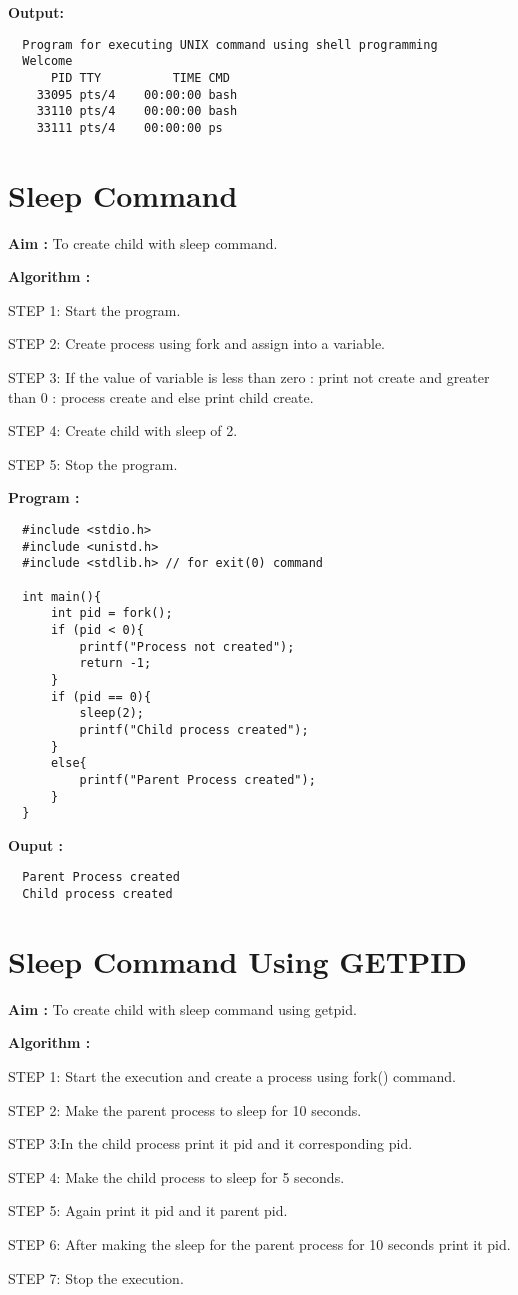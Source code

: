 \documentclass[journal,onecolumn]{IEEEtran}
\begin{document}
\textbf{Output:}
\begin{verbatim}
  Program for executing UNIX command using shell programming 
  Welcome
      PID TTY          TIME CMD
    33095 pts/4    00:00:00 bash
    33110 pts/4    00:00:00 bash
    33111 pts/4    00:00:00 ps  
\end{verbatim}


\section{Sleep Command}
\textbf{Aim : } To create child with sleep command.

\textbf{Algorithm : }
\begin{list}{}{}
  \item STEP 1: Start the program.
  \item STEP 2: Create process using fork and assign into a variable.
  \item STEP 3: If the value of variable is less than zero : print not create and greater than 0 :  process create
  and else print child create.
  \item STEP 4: Create child with sleep of
  2. 
  \item STEP 5: Stop the program.
\end{list}

\textbf{Program : }
\begin{verbatim}
  #include <stdio.h>
  #include <unistd.h>
  #include <stdlib.h> // for exit(0) command

  int main(){
      int pid = fork();
      if (pid < 0){
          printf("Process not created");
          return -1;
      } 
      if (pid == 0){
          sleep(2);
          printf("Child process created");
      }
      else{
          printf("Parent Process created");
      }
  }
\end{verbatim}

\textbf{Ouput :}
\begin{verbatim}
  Parent Process created
  Child process created
\end{verbatim}

\section{Sleep Command Using GETPID}
\textbf{Aim : } To create child with sleep command using getpid.

\textbf{Algorithm : }
\begin{list}{}{}
  \item STEP 1: Start the execution and create a process using fork() command.
  \item STEP 2: Make the parent process to sleep for 10 seconds.
  \item STEP 3:In the child process print it pid and it corresponding pid.
  \item STEP 4: Make the child process to sleep for 5 seconds.
  \item STEP 5: Again print it pid and it parent pid.
  \item STEP 6: After making the sleep for the parent process for 10 seconds print it
  pid.
  \item STEP 7: Stop the execution.
\end{list}
\end{document}
